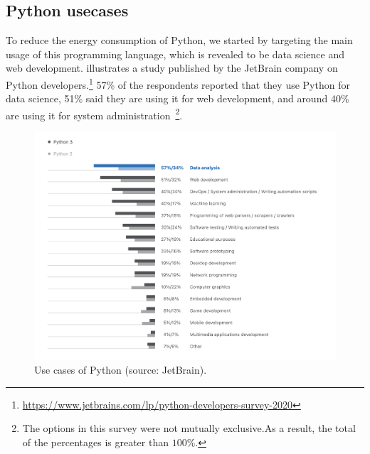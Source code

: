 \subsection{Python usecases}
To reduce the energy consumption of Python, we started by targeting the main usage of this programming language, which is revealed to be data science and web development.
 illustrates a study published by the JetBrain company on Python developers.\footnote{\url{https://www.jetbrains.com/lp/python-developers-survey-2020}}
57\% of the respondents reported that they use Python for data science, 51\% said they are using it for web development, and around 40\% are using it for system administration~\footnote{The options in this survey were not mutually exclusive.As a result, the total of the percentages is greater than $100\%$.}.

\begin{figure}[hbt]
    \centering
    \includegraphics[width=\linewidth]{imgs/python_use_cases}
    \caption{Use cases of Python (source: JetBrain).}
    \label{fig:usecase}
\end{figure}

